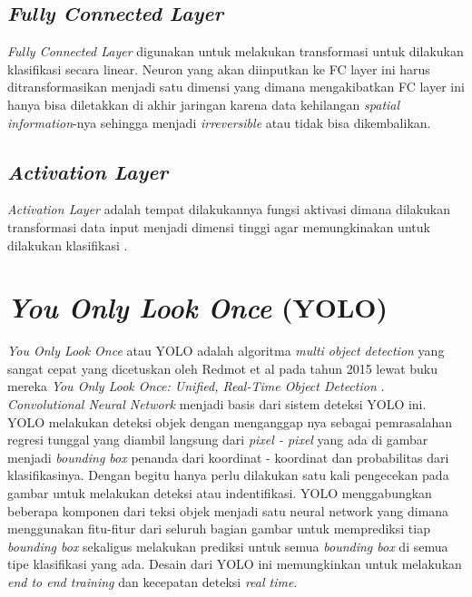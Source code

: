 \subsection{\emph{Fully Connected Layer}}
\label{subsec:fullyconnectedlayer}

\par \emph{Fully Connected Layer} digunakan untuk melakukan transformasi untuk dilakukan klasifikasi secara linear.
Neuron yang akan diinputkan ke FC layer ini harus ditransformasikan menjadi satu dimensi yang dimana
mengakibatkan FC layer ini hanya bisa diletakkan di akhir jaringan karena data kehilangan \emph{spatial information}-nya
sehingga menjadi \emph{irreversible} atau tidak bisa dikembalikan.

\subsection{\emph{Activation Layer}}
\label{subsec:activationlayer}

\par \emph{Activation Layer} adalah tempat dilakukannya fungsi aktivasi dimana dilakukan transformasi data input
menjadi dimensi tinggi agar memungkinakan untuk dilakukan klasifikasi \cite{putra2016klasifikasi}.



\section{\emph{You Only Look Once} (YOLO)}
\label{sec:youonlylookone}

\emph{You Only Look Once} atau YOLO adalah algoritma \emph{multi object detection} yang sangat cepat yang dicetuskan oleh Redmot et al pada tahun 2015 lewat buku mereka \emph{You Only Look Once: Unified, Real-Time Object Detection} \cite{redmon2016you}. \emph{Convolutional Neural Network} menjadi basis dari sistem deteksi YOLO ini. YOLO melakukan deteksi objek dengan menganggap nya sebagai pemrasalahan regresi tunggal yang diambil langsung dari \emph{pixel - pixel} yang ada di gambar menjadi \emph{bounding box} penanda dari koordinat - koordinat dan probabilitas dari klasifikasinya. Dengan begitu hanya perlu dilakukan satu kali pengecekan pada gambar untuk melakukan deteksi atau indentifikasi. \cite{redmon2016you} YOLO menggabungkan beberapa komponen dari teksi objek menjadi satu neural network yang dimana menggunakan fitu-fitur dari seluruh bagian gambar untuk memprediksi tiap \emph{bounding box} sekaligus melakukan prediksi untuk semua \emph{bounding box} di semua tipe klasifikasi yang ada. Desain dari YOLO ini memungkinkan untuk melakukan \emph{end to end training} dan kecepatan deteksi \emph{real time}.

